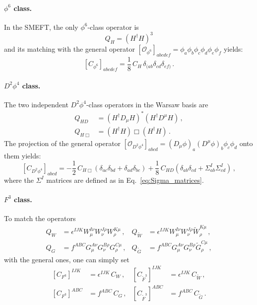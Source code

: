\paragraph{$\phi^6$ class.} 
In the SMEFT, the only $\phi^6$-class operator is
\begin{equation}
    Q_H = \left(H^\dagger H\right)^3
\end{equation}
and its matching with the general operator $[\mathcal O_{\phi^6}]_{abcdef} = \phi_a \phi_b \phi_c \phi_d \phi_e \phi_f$ yields:
\begin{equation}
    \left[C_{\phi^6}\right]_{abcdef} = \frac{1}{8}\,C_H\,\delta_{(ab}\delta_{cd}\delta_{ef)}\,.\label{eq:CHdef}
\end{equation}

\paragraph{$D^2\phi^4$ class.}
The two independent $D^2\phi^4$-class operators in the Warsaw basis are
\begin{align}
Q_{HD} &= \left(H^\dagger D_\mu H\right)^*\left(H^\dagger D^\mu H\right)\,,\label{eq:QHDdef}
\\
    Q_{H\Box} &= \left(H^\dagger H\right)\Box \left(H^\dagger H\right)\,.\label{eq:QHBoxdef}
\end{align}
The projection of the general operator $[\mathcal O_{D^2\phi^4}]_{abcd} = (D_\mu \phi)_a (D^\mu \phi)_b \phi_c \phi_d$ onto them yields:
\begin{equation}
    \left[C_{D^2\phi^4}\right]_{abcd} = -\frac{1}{2}\,C_{H\Box} \left(\delta_{ac}\delta_{bd}+\delta_{ad}\delta_{bc}\right)+\frac{1}{8}\,C_{HD}\left(\delta_{ab}\delta_{cd}+\Sigma^I_{ab}\Sigma^I_{cd}\right)\,,\label{eq:CD2phi4toSMEFT}
\end{equation}
where the $\Sigma^I$ matrices are defined as in Eq.~\eqref{eq:Sigma_matrices}.

\paragraph{$F^3$ class.}
To match the operators
\begin{align}
    Q_W &= \epsilon^{IJK}W_\mu^{I\nu}W_\nu^{J\rho}W_\rho^{K\mu}\,,
    &
    Q_{\widetilde W} &= \epsilon^{IJK}W_\mu^{I\nu}W_\nu^{J\rho}\widetilde W_\rho^{K\mu}\,,
    \\
    Q_G &= f^{ABC}G_\mu^{A\nu}G_\nu^{B\rho}G_\rho^{C\mu}\,,
    &
    Q_{\widetilde G} &= f^{ABC}G_\mu^{A\nu}G_\nu^{B\rho}\widetilde G_\rho^{C\mu}\,,
\end{align}
with the general ones, one can simply set
\begin{align}
    \left[C_{F^3}\right]^{IJK} &= \epsilon^{IJK}\,C_W\,,
    &
    \left[C_{\widetilde F^3}\right]^{IJK} &= \epsilon^{IJK}\,C_{\widetilde W}\,,
    \\
    \left[C_{F^3}\right]^{ABC} &= f^{ABC}\,C_{G}\,,
    &
    \left[C_{\widetilde F^3}\right]^{ABC} &= f^{ABC}\,C_{\widetilde G}\,.
\end{align}


